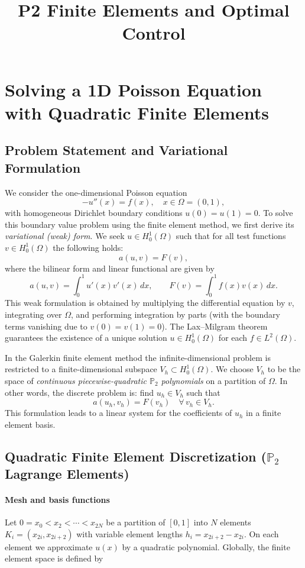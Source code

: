 \documentclass{article}
\title{P2 Finite Elements and Optimal Control}
\author{}
\date{}
\begin{document}
\maketitle
\section{Solving a 1D Poisson Equation with Quadratic Finite Elements}

\subsection{Problem Statement and Variational Formulation}

We consider the one-dimensional Poisson equation
\[
	-u''(x)=f(x), \quad x\in\Omega=(0,1),
\]
with homogeneous Dirichlet boundary conditions \(u(0)=u(1)=0\).
To solve this boundary value problem using the finite element method, we first derive its \emph{variational (weak) form}. We seek \(u\in H_0^1(\Omega)\) such that for all test functions \(v\in H_0^1(\Omega)\) the following holds:
\[
	a(u,v)=F(v),
\]
where the bilinear form and linear functional are given by
\[
	a(u,v)=\int_0^1 u'(x)v'(x)\,dx,\qquad F(v)=\int_0^1 f(x)v(x)\,dx.
\]
This weak formulation is obtained by multiplying the differential equation by \(v\), integrating over \(\Omega\), and performing integration by parts (with the boundary terms vanishing due to \(v(0)=v(1)=0\)). The Lax--Milgram theorem guarantees the existence of a unique solution \(u\in H_0^1(\Omega)\) for each \(f\in L^2(\Omega)\).

In the Galerkin finite element method the infinite-dimensional problem is restricted to a finite-dimensional subspace \(V_h\subset H_0^1(\Omega)\). We choose \(V_h\) to be the space of \emph{continuous piecewise-quadratic \(\mathbb{P}_2\) polynomials} on a partition of \(\Omega\). In other words, the discrete problem is: find \(u_h\in V_h\) such that
\[
	a(u_h,v_h)=F(v_h)\quad\forall\, v_h\in V_h.
\]
This formulation leads to a linear system for the coefficients of \(u_h\) in a finite element basis.

\subsection{Quadratic Finite Element Discretization (\(\mathbb{P}_2\) Lagrange Elements)}

\paragraph{Mesh and basis functions}
Let \(0=x_0<x_2<\cdots<x_{2N}\) be a partition of \([0,1]\) into \(N\) elements \(K_i=(x_{2i},x_{2i+2})\) with variable element lengths \(h_i=x_{2i+2}-x_{2i}\).
On each element we approximate \(u(x)\) by a quadratic polynomial.
Globally, the finite element space is defined by
\end{document}
